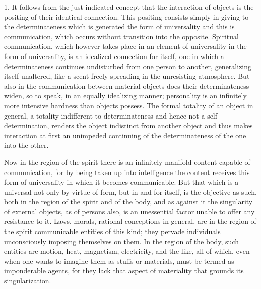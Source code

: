 1. It follows from the just indicated concept
that the interaction of objects is
the positing of their identical connection.
This positing consists simply in giving to
the determinateness which is generated
the form of universality and this is communication,
which occurs without transition into the opposite.
Spiritual communication, which however takes place in
an element of universality in the form of universality,
is an idealized connection for itself,
one in which a determinateness continues undisturbed from
one person to another, generalizing itself unaltered,
like a scent freely spreading in the unresisting atmosphere.
But also in the communication between material objects
does their determinateness widen, so to speak,
in an equally idealizing manner;
personality is an infinitely more
intensive hardness than objects possess.
The formal totality of an object in general,
a totality indifferent to determinateness
and hence not a self-determination,
renders the object indistinct from another object
and thus makes interaction at first an unimpeded continuing
of the determinateness of the one into the other.

Now in the region of the spirit there is
an infinitely manifold content capable of communication,
for by being taken up into intelligence the content receives
this form of universality in which it becomes communicable.
But that which is a universal not only by virtue of form,
but in and for itself, is the objective as such,
both in the region of the spirit and of the body,
and as against it the singularity of
external objects, as of persons also,
is an unessential factor unable to offer
any resistance to it.
Laws, morals, rational conceptions in general,
are in the region of the spirit communicable entities of this kind;
they pervade individuals unconsciously imposing themselves on them.
In the region of the body, such entities are
motion, heat, magnetism, electricity, and the like,
all of which, even when one wants to imagine them
as stuffs or materials,
must be termed as imponderable agents,
for they lack that aspect of materiality
that grounds its singularization.


